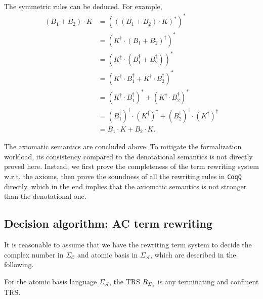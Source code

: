 \documentclass[manuscript, review, timestamp]{acmart}
\begin{document}
The symmetric rules can be deduced. For example,
\begin{align*}
(B_1 + B_2) \cdot K & = (((B_1 + B_2) \cdot K)^*)^* \\
& = (K^\dagger \cdot (B_1 + B_2)^\dagger)^* \\
& = (K^\dagger \cdot (B_1^\dagger + B_2^\dagger))^* \\
& = (K^\dagger \cdot B_1^\dagger + K^\dagger \cdot B_2^\dagger)^* \\
& = (K^\dagger \cdot B_1^\dagger)^* + (K^\dagger \cdot B_2^\dagger)^* \\
& = (B_1^\dagger)^\dagger \cdot (K^\dagger)^\dagger + (B_2^\dagger)^\dagger \cdot (K^\dagger)^\dagger \\
& = B_1 \cdot K + B_2 \cdot K.
\end{align*}

The axiomatic semantics are concluded above. To mitigate the formalization workload, its consistency compared to the denotational semantics is not directly proved here. Instead, we first prove the completeness of the term rewriting system w.r.t. the axioms, then prove the soundness of all the rewriting rules in \texttt{CoqQ} directly, which in the end implies that the axiomatic semantics is not stronger than the denotational one.


\subsection{Decision algorithm: AC term rewriting}
\label{sec: typed_dirac_rules}

It is reasonable to assume that we have the rewriting term system to decide the complex number in $\Sigma_\mathcal{C}$ and atomic basis in $\Sigma_\mathcal{A}$, which are described in the following.

\begin{definition}
  For the atomic basis language $\Sigma_\mathcal{A}$, the TRS $R_{\Sigma_\mathcal{A}}$ is any terminating and confluent TRS.
\end{definition}
\end{document}
